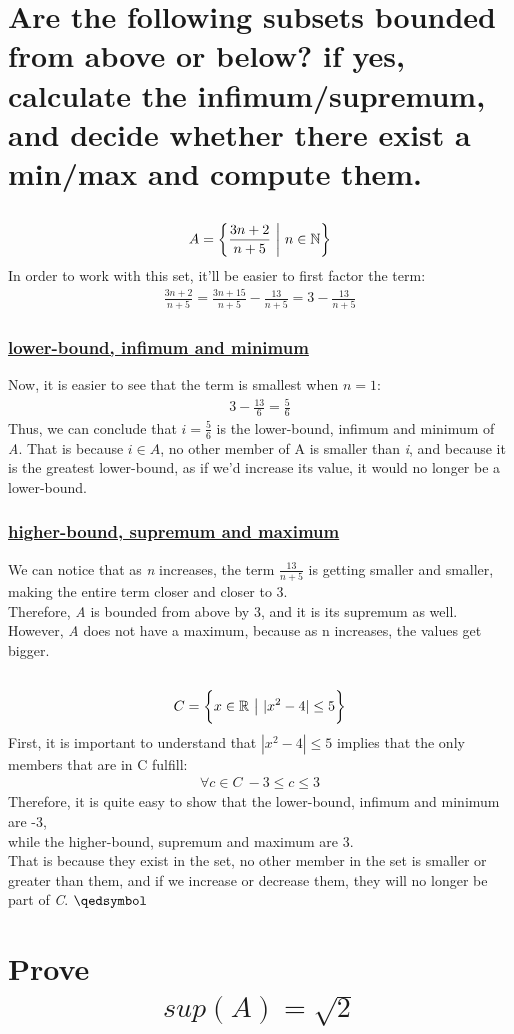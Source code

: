 \documentclass[a4paper, 12pt]{article}
\newcommand{\sub}[1]{\subsection{\underline{#1}}}
\newcommand{\subsub}[1]{\subsubsection{\underline{#1}}}
\newcommand{\R}{\ensuremath{\mathbb{R}}}
\newcommand{\N}{\ensuremath{\mathbb{N}}}
\newcommand{\eq}[1]{\begin{align*}#1\end{align*}}
\newcommand{\bigset}[1]{\bigg{\{} #1 \bigg{\}}}
\renewcommand{\qed}{\hfill\(\qedsymbol\)}
\begin{document}
\section{Are the following subsets bounded from above or below? if yes, calculate the infimum/supremum, and decide whether there exist a min/max and compute them.}
\sub{}
\eq{
    A=\bigg{\{}
        \frac{3n+2}{n+5}~\bigg{|}~n\in\N
    \bigg{\}}
}
In order to work with this set, it'll be easier to first factor the term:
\eq{
    \frac{3n+2}{n+5}=\frac{3n+15}{n+5}-\frac{13}{n+5}=3-\frac{13}{n+5}
}
\subsub{lower-bound, infimum and minimum}
Now, it is easier to see that the term is smallest when $n=1$:
\eq{
    3-\frac{13}{6}=\frac{5}{6}
}
Thus, we can conclude that $i=\frac{5}{6}$ is the lower-bound, infimum and minimum of \textit{A}.
That is because $i\in{A}$, no other member of A is smaller than \textit{i}, and because it is the greatest lower-bound,
as if we'd increase its value, it would no longer be a lower-bound.
\subsub{higher-bound, supremum and maximum}
We can notice that as \textit{n} increases, the term $\frac{13}{n+5}$ is getting smaller and smaller, making the entire term closer and closer to 3.\\
Therefore, \textit{A} is bounded from above by 3, and it is its supremum as well.\\
However, \textit{A} does not have a maximum, because as n increases, the values get bigger.
\setcounter{subsection}{2}
\sub{}
\eq{
    C=\bigset{
        x\in\R~\big{|}~|x^2-4|\leq{5}
    }        
}
First, it is important to understand that $|x^2-4|\leq{5}$ implies that the only members that are in C fulfill:
\eq{
    \forall{c}\in{C}~-3\leq{c}\leq{3}
}
Therefore, it is quite easy to show that the lower-bound, infimum and minimum are -3,\\
while the higher-bound, supremum and maximum are 3.\\
That is because they exist in the set, no other member in the set is smaller or greater than them, and if we increase or decrease them, they will no longer be part of \textit{C}.
\qed\pagebreak

\section{Prove \eq{sup(A)=\sqrt{2}}}

\end{document}
